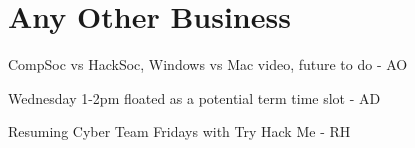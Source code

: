 \documentclass[11pt,hacksoc]{meetingmins}
\begin{document}
\section{Any Other Business}
\begin{items}
\item {CompSoc vs HackSoc, Windows vs Mac video, future to do - AO}
\item {Wednesday 1-2pm floated as a potential term time slot - AD}
\item {Resuming Cyber Team Fridays with Try Hack Me - RH}
\end{items}

\vspace{1em}
\nextmeeting{}
\end{document}

